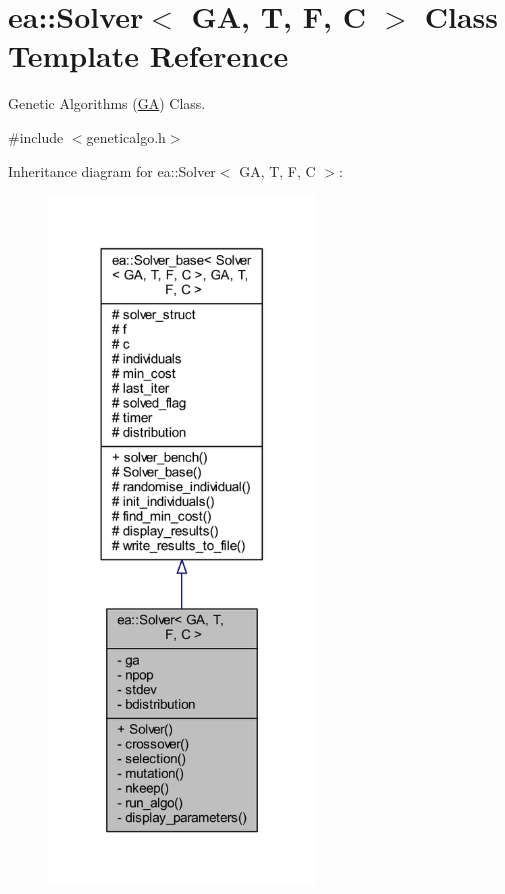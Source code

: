 \hypertarget{classea_1_1_solver_3_01_g_a_00_01_t_00_01_f_00_01_c_01_4}{}\section{ea\+:\+:Solver$<$ GA, T, F, C $>$ Class Template Reference}
\label{classea_1_1_solver_3_01_g_a_00_01_t_00_01_f_00_01_c_01_4}


Genetic Algorithms (\hyperlink{structea_1_1_g_a}{GA}) Class.  




{\ttfamily \#include $<$geneticalgo.\+h$>$}



Inheritance diagram for ea\+:\+:Solver$<$ GA, T, F, C $>$\+:
\nopagebreak
\begin{figure}[H]
\begin{center}
\leavevmode
\includegraphics[width=201pt]{classea_1_1_solver_3_01_g_a_00_01_t_00_01_f_00_01_c_01_4__inherit__graph}
\end{center}
\end{figure}
